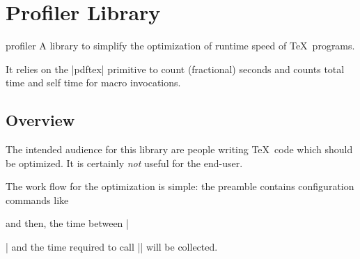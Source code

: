 %
%
%

\section{Profiler Library}
{}

\begin{pgflibrary}{profiler}
	A library to simplify the optimization of runtime speed of \TeX\ programs.

	It relies on the |pdftex| primitive \declareandlabel{\pdfelapsedtime} to count (fractional) seconds and counts total time and self time for macro invocations.
\end{pgflibrary}

\subsection{Overview}
The intended audience for this library are people writing \TeX\ code which should be optimized. It is certainly \emph{not} useful for the end-user.

The work flow for the optimization is simple: the preamble contains configuration commands like
\begin{codeexample}
\end{codeexample}
\noindent and then, the time between || and the time required to call |\pgfkeys| will be collected.

